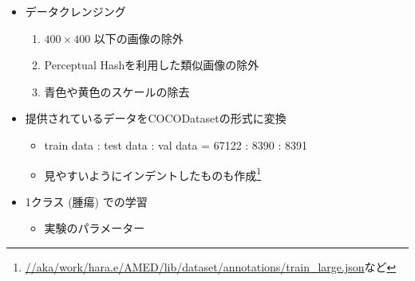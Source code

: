 \documentclass[a4j]{ujarticle}
\begin{document}
        \begin{itemize}
            \item データクレンジング
            \begin{enumerate}
                \item $400 \times 400$ 以下の画像の除外
                \item Perceptual Hashを利用した類似画像の除外
                \item 青色や黄色のスケールの除去
            \end{enumerate}

            \item 提供されているデータをCOCODatasetの形式に変換
            \begin{itemize}
                \item train data : test data : val data = 67122 : 8390 : 8391
                \item 見やすいようにインデントしたものも作成\footnote{\url{//aka/work/hara.e/AMED/lib/dataset/annotations/train_large.json}など}
            \end{itemize}

            \item 1クラス (腫瘍) での学習
            \begin{itemize}
                \item 実験のパラメーター
            \end{itemize}


\end{itemize}
\end{document}

